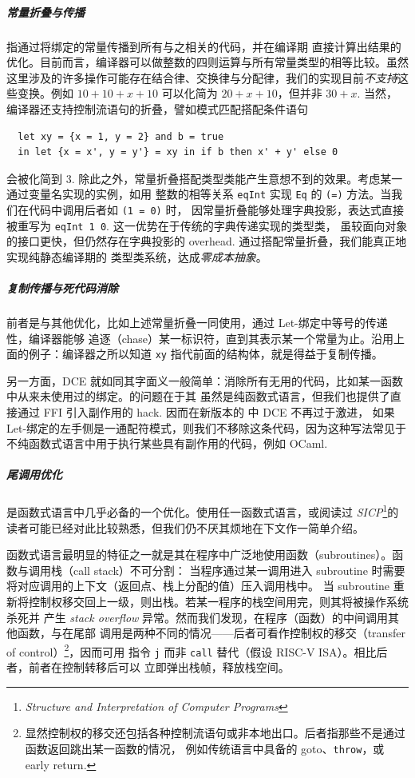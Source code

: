 \documentclass[a4paper, 11pt]{article}
\theoremstyle{remark}\newtheorem*{remark}{Remark}
\theoremstyle{definition}\newtheorem*{definition}{Definition}
\begin{document}
\subparagraph{常量折叠与传播} 指通过将绑定的常量传播到所有与之相关的代码，并在编译期
直接计算出结果的优化。目前而言，\Tigris 编译器可以做整数的四则运算与所有常量类型的相等比较。虽然
这里涉及的许多操作可能存在结合律、交换律与分配律，我们的实现目前\emph{不支持}这些变换。例如 $10 + 10 + x + 10$
可以化简为 $20 + x + 10$，但并非 $30 + x$. 当然，编译器还支持控制流语句的折叠，譬如模式匹配搭配条件语句
\begin{verbatim}
  let xy = {x = 1, y = 2} and b = true
  in let {x = x', y = y'} = xy in if b then x' + y' else 0
\end{verbatim}
会被化简到 $3$. 除此之外，常量折叠搭配类型类能产生意想不到的效果。考虑某一通过变量名实现的实例，如用
整数的相等关系 \texttt{eqInt} 实现 \texttt{Eq} 的 \texttt{(=)} 方法。当我们在代码中调用后者如 \texttt{(1 = 0)} 时，
因常量折叠能够处理字典投影，表达式直接被重写为 \texttt{eqInt 1 0}. 这一优势在于传统的字典传递实现的类型类，
虽较面向对象的接口更快，但仍然存在字典投影的 overhead. 通过搭配常量折叠，我们能真正地实现纯静态编译期的
类型类系统，达成\emph{零成本抽象}。

\subparagraph{复制传播与死代码消除} 前者是与其他优化，比如上述常量折叠一同使用，通过 Let-绑定中等号的传递性，编译器能够
追逐（chase）某一标识符，直到其表示某一个常量为止。沿用上面的例子：编译器之所以知道 \texttt{xy} 指代前面的结构体，就是得益于复制传播。

另一方面，DCE 就如同其字面义一般简单：消除所有无用的代码，比如某一函数中从来未使用过的绑定。\Tigris 的问题在于其
虽然是纯函数式语言，但我们也提供了直接通过 FFI 引入副作用的 hack. 因而在新版本的 \Tigris 中 DCE 不再过于激进，
如果 Let-绑定的左手侧是一通配符模式，则我们不移除这条代码，因为这种写法常见于不纯函数式语言中用于执行某些具有副作用的代码，例如 OCaml.

\subparagraph{尾调用优化} 是函数式语言中几乎必备的一个优化。使用任一函数式语言，或阅读过 \emph{SICP}\footnote{
  \emph{Structure and Interpretation of Computer Programs}
}的读者可能已经对此比较熟悉，但我们仍不厌其烦地在下文作一简单介绍。

函数式语言最明显的特征之一就是其在程序中广泛地使用函数（subroutines）。函数与调用栈（call stack）不可分割：
当程序通过某一调用进入 subroutine 时需要将对应调用的上下文（返回点、栈上分配的值）压入调用栈中。
当 subroutine 重新将控制权移交回上一级，则出栈。若某一程序的栈空间用完，则其将被操作系统杀死并
产生 \emph{stack overflow} 异常。然而我们发现，在程序（函数）的中间调用其他函数，与在尾部
调用是两种不同的情况——后者可看作控制权的移交（transfer of control）\footnote{
  显然控制权的移交还包括各种控制流语句或非本地出口。后者指那些不是通过函数返回跳出某一函数的情况，
  例如传统语言中具备的 goto、\texttt{throw}，或 early return.
}，因而可用
指令 \texttt{j} 而非 \texttt{call} 替代（假设 RISC-V ISA）。相比后者，前者在控制转移后可以
立即弹出栈帧，释放栈空间。
\end{document}
